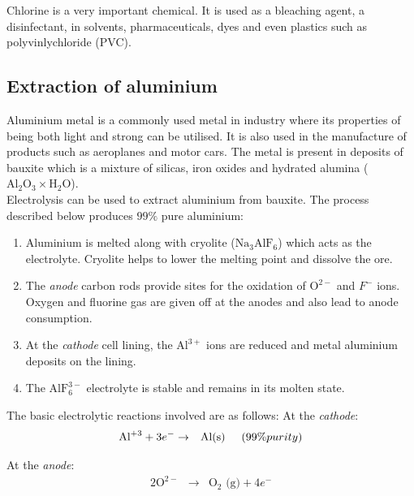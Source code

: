 Chlorine is a very important chemical. It is used as a bleaching agent, a disinfectant, in solvents, pharmaceuticals, dyes and even plastics such as polyvinlychloride (PVC).

\subsection{Extraction of aluminium}

Aluminium metal is a commonly used metal in industry where its properties of being both light and strong can be utilised. It is also used in the manufacture of products such as aeroplanes and motor cars. The metal is present in
deposits of bauxite which is a mixture of silicas, iron oxides and hydrated alumina ($\text{Al}_{2}\text{O}_{3} \times \text{H}_{2}\text{O}$). \\

Electrolysis can be used to extract aluminium from bauxite. The process described below produces $99\%$ pure aluminium:

\begin{enumerate}


  \item Aluminium is melted along with cryolite ($\text{Na}_{3}\text{AlF}_{6}$) which acts as the electrolyte. Cryolite helps to lower the melting point and dissolve the ore.
  \item  The \emph{anode} carbon rods provide sites for the oxidation of $\text{O}^{2-}$
  and $F^{-}$ ions. Oxygen and fluorine gas are given off at the anodes and
  also lead to anode consumption.
  \item At the \emph{cathode} cell lining, the $\text{Al}^{3+}$ ions are reduced and metal
  aluminium deposits on the lining.
  \item The $\text{AlF}_{6}^{3-}$ electrolyte is stable and remains in its molten state.
\end{enumerate}

The basic electrolytic reactions involved are as follows:
At the \emph{cathode}:
\begin{eqnarray*}
  \text{Al}^{+3} + 3e^{-} &\rightarrow& \text{Al(s)} \hspace{.5cm} (99\% purity)
  \end{eqnarray*}

At the \emph{anode}:
\begin{eqnarray*}
  2\text{O}^{2-} &\rightarrow& \text{O}_{2}\text{ (g)} + 4e^{-}
\end{eqnarray*}

